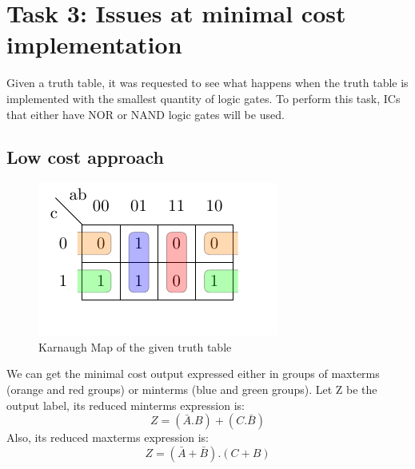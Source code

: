 \documentclass[a4paper,12pt]{article}
\begin{document}
\newdimen\origiwspc%
\newdimen\origiwstr%


\section*{Task 3: Issues at minimal cost implementation}

Given a truth table, it was requested to see what happens
when the truth table is implemented with the smallest quantity of logic
gates. To perform this task, ICs that either have NOR 
or NAND logic gates will be used.

\subsection*{Low cost approach}
\begin{figure}[htbp]
    \begin{center}
    \includegraphics{karnaugh.pdf}
    
    \end{center}
    
    \caption{Karnaugh Map of the given truth table}
    \label{fig:KarnaughMap}
    \end{figure}
We can get the minimal cost output expressed either in groups of 
maxterms (orange and red groups) or minterms (blue and green groups).
\linebreak
Let Z be the output label, its reduced minterms expression is:
\begin{equation}
    Z= (\bar{A}.B)+(C.\bar{B})
\end{equation} 
Also, its reduced maxterms expression is:
\begin{equation}
    Z= (\bar{A}+\bar{B}).(C+B)
\end{equation} 
\end{document}
